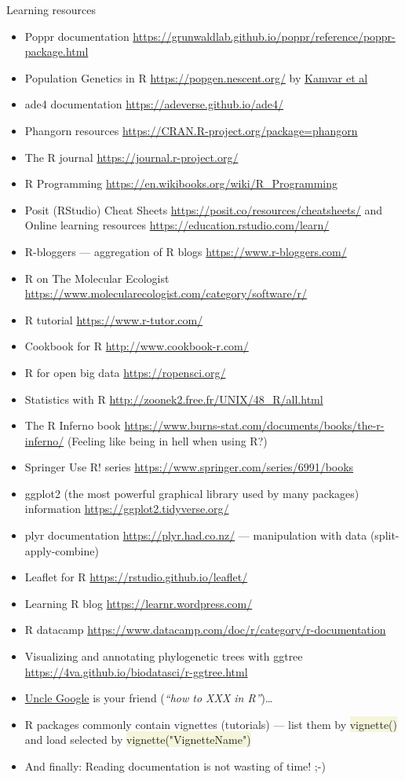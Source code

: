 \documentclass[compress, xelatex, 11pt, xcolor=svgnames, aspectratio=169, url={hyphens, lowtilde}]{beamer}
\renewcommand{\texttt}[1]{\colorbox{Beige}{{\ttfamily #1}}}
\begin{document}
\begin{frame}[allowframebreaks]{Learning resources}
\begin{itemize}
		\item Poppr documentation \url{https://grunwaldlab.github.io/poppr/reference/poppr-package.html}
		\item Population Genetics in R \url{https://popgen.nescent.org/} by \href{https://doi.org/10.1111/1755-0998.12558}{Kamvar et al}
		\item ade4 documentation \url{https://adeverse.github.io/ade4/}
		\item Phangorn resources \url{https://CRAN.R-project.org/package=phangorn}
		\item The R journal \url{https://journal.r-project.org/}
		\item R Programming \url{https://en.wikibooks.org/wiki/R_Programming}
		\item Posit (RStudio) Cheat Sheets \url{https://posit.co/resources/cheatsheets/} and Online learning resources \url{https://education.rstudio.com/learn/}
		\item R-bloggers --- aggregation of R blogs \url{https://www.r-bloggers.com/}
		\item R on The Molecular Ecologist \url{https://www.molecularecologist.com/category/software/r/}
		\item R tutorial \url{https://www.r-tutor.com/}
		\item Cookbook for R  \url{http://www.cookbook-r.com/}
		\item R for open big data \url{https://ropensci.org/}
		\item Statistics with R \url{http://zoonek2.free.fr/UNIX/48_R/all.html}
		\item The R Inferno book \url{https://www.burns-stat.com/documents/books/the-r-inferno/} (Feeling like being in hell when using R?)
		\item Springer Use R! series \url{https://www.springer.com/series/6991/books}
		\item ggplot2 (the most powerful graphical library used by many packages) information \url{https://ggplot2.tidyverse.org/}
		\item plyr documentation \url{https://plyr.had.co.nz/} --- manipulation with data (split-apply-combine)
		\item Leaflet for R \url{https://rstudio.github.io/leaflet/}
		\item Learning R blog \url{https://learnr.wordpress.com/}
		\item R datacamp \url{https://www.datacamp.com/doc/r/category/r-documentation}
		\item Visualizing and annotating phylogenetic trees with ggtree \url{https://4va.github.io/biodatasci/r-ggtree.html}
		\item \href{https://rseek.org/}{Uncle Google} is your friend (\textit{\enquote{how to XXX in R}})\ldots
		\item R packages commonly contain vignettes (tutorials) --- list them by \texttt{vignette()} and load selected by \texttt{vignette("VignetteName")}
		\item And finally: \alert{Reading documentation is not wasting of time!} ;-)
	\end{itemize}
\end{frame}
\end{document}
